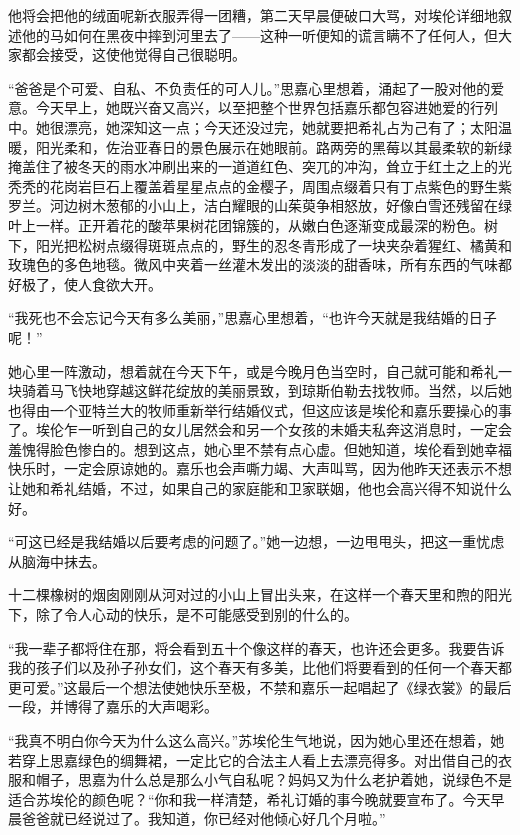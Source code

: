 \par 他将会把他的绒面呢新衣服弄得一团糟，第二天早晨便破口大骂，对埃伦详细地叙述他的马如何在黑夜中摔到河里去了——这种一听便知的谎言瞒不了任何人，但大家都会接受，这使他觉得自己很聪明。
\par “爸爸是个可爱、自私、不负责任的可人儿。”思嘉心里想着，涌起了一股对他的爱意。今天早上，她既兴奋又高兴，以至把整个世界包括嘉乐都包容进她爱的行列中。她很漂亮，她深知这一点；今天还没过完，她就要把希礼占为己有了；太阳温暖，阳光柔和，佐治亚春日的景色展示在她眼前。路两旁的黑莓以其最柔软的新绿掩盖住了被冬天的雨水冲刷出来的一道道红色、突兀的冲沟，耸立于红土之上的光秃秃的花岗岩巨石上覆盖着星星点点的金樱子，周围点缀着只有丁点紫色的野生紫罗兰。河边树木葱郁的小山上，洁白耀眼的山茱萸争相怒放，好像白雪还残留在绿叶上一样。正开着花的酸苹果树花团锦簇的，从嫩白色逐渐变成最深的粉色。树下，阳光把松树点缀得斑斑点点的，野生的忍冬青形成了一块夹杂着猩红、橘黄和玫瑰色的多色地毯。微风中夹着一丝灌木发出的淡淡的甜香味，所有东西的气味都好极了，使人食欲大开。
\par “我死也不会忘记今天有多么美丽，”思嘉心里想着，“也许今天就是我结婚的日子呢！”
\par 她心里一阵激动，想着就在今天下午，或是今晚月色当空时，自己就可能和希礼一块骑着马飞快地穿越这鲜花绽放的美丽景致，到琼斯伯勒去找牧师。当然，以后她也得由一个亚特兰大的牧师重新举行结婚仪式，但这应该是埃伦和嘉乐要操心的事了。埃伦乍一听到自己的女儿居然会和另一个女孩的未婚夫私奔这消息时，一定会羞愧得脸色惨白的。想到这点，她心里不禁有点心虚。但她知道，埃伦看到她幸福快乐时，一定会原谅她的。嘉乐也会声嘶力竭、大声叫骂，因为他昨天还表示不想让她和希礼结婚，不过，如果自己的家庭能和卫家联姻，他也会高兴得不知说什么好。
\par “可这已经是我结婚以后要考虑的问题了。”她一边想，一边甩甩头，把这一重忧虑从脑海中抹去。
\par 十二棵橡树的烟囱刚刚从河对过的小山上冒出头来，在这样一个春天里和煦的阳光下，除了令人心动的快乐，是不可能感受到别的什么的。
\par “我一辈子都将住在那，将会看到五十个像这样的春天，也许还会更多。我要告诉我的孩子们以及孙子孙女们，这个春天有多美，比他们将要看到的任何一个春天都更可爱。”这最后一个想法使她快乐至极，不禁和嘉乐一起唱起了《绿衣裳》的最后一段，并博得了嘉乐的大声喝彩。
\par “我真不明白你今天为什么这么高兴。”苏埃伦生气地说，因为她心里还在想着，她若穿上思嘉绿色的绸舞裙，一定比它的合法主人看上去漂亮得多。对出借自己的衣服和帽子，思嘉为什么总是那么小气自私呢？妈妈又为什么老护着她，说绿色不是适合苏埃伦的颜色呢？“你和我一样清楚，希礼订婚的事今晚就要宣布了。今天早晨爸爸就已经说过了。我知道，你已经对他倾心好几个月啦。”

